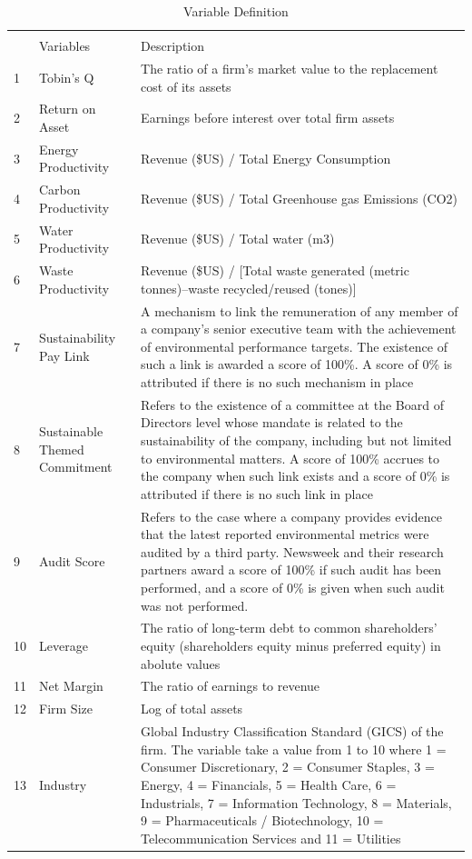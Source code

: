 \documentclass[12pt,]{article}
\begin{document}
\begin{table}[h]
\centering
\caption{Variable Definition} 
\label{VarDef}
\begin{tabular}{lp{3cm}p{11cm}}
\\[-1.8ex]\hline 
\hline \\[-1.8ex] 
 & Variables & Description \\ 
\hline
1 & Tobin's Q & The ratio of a firm’s market value to the replacement cost of its assets \\ 
2 & Return on Asset & Earnings before interest over total firm assets \\ 
3 & Energy Productivity & Revenue (\$US) / Total Energy Consumption \\ 
4 & Carbon Productivity & Revenue (\$US) / Total Greenhouse gas Emissions (CO2) \\ 
5 & Water Productivity & Revenue (\$US) / Total water (m3) \\ 
6 & Waste Productivity & Revenue (\$US) / [Total waste generated (metric tonnes)–waste recycled/reused (tones)] \\ 
7 & Sustainability Pay Link & A mechanism to link the remuneration of any member of a company's senior executive team with the achievement of environmental performance targets. The existence of such a link is awarded a score of 100\%. A score of 0\% is attributed if there is no such mechanism in place \\ 
8 & Sustainable Themed Commitment & Refers to the existence of a committee at the Board of Directors level whose mandate is related to the sustainability of the company, including but not limited to environmental matters. A score of 100\% accrues to the company when such link exists and a score of 0\% is attributed if there is no such link in place \\ 
9 & Audit Score & Refers to the case where a company provides evidence that the latest reported environmental metrics were audited by a third party. Newsweek and their research partners award a score of 100\% if such audit has been performed, and a score of 0\% is given when such audit was not performed. \\ 
10 & Leverage & The ratio of long-term debt to common shareholders' equity (shareholders equity minus preferred equity) in abolute values \\ 
11 & Net Margin & The ratio of earnings to revenue \\ 
12 & Firm Size & Log of total assets \\ 
13 & Industry & Global Industry Classification Standard (GICS) of the firm. The variable take a value from 1 to 10 where 1 = Consumer Discretionary, 2 = Consumer Staples, 3 = Energy, 4 = Financials, 5 = Health Care, 6 = Industrials, 7 = Information Technology, 8 = Materials, 9 = Pharmaceuticals / Biotechnology, 10 = Telecommunication Services and 11 = Utilities \\ 
\hline
\end{tabular}
\end{table}
\end{document}
